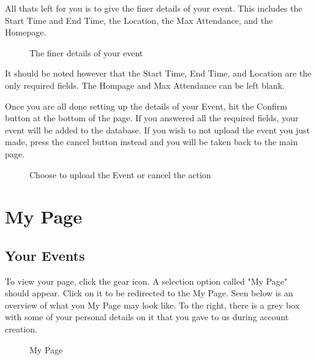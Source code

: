\documentclass[10pt]{article}
\newcommand{\fancysec}[2] {{\color{primary}\section{#1} \label{sec:#2}}}
\newcommand{\fancysub}[2] {{\color{primary}\subsection{#1} \label{sec:#2}}}
\begin{document}
			 All thats left for you is to give the finer details of your event. This includes the Start Time and End Time, the Location, the Max Attendance, and the Homepage.
			 
			  \begin{figure}[H]
			  	\centering
			  	\caption{The finer details of your event}
			  	\label{fig:awesome_image}
			  \end{figure}
			  
			  It should be noted however that the Start Time, End Time, and Location are the only required fields. The Hompage and Max Attendance can be left blank. \\
			  \par Once you are all done setting up the details of your Event, hit the Confirm button at the bottom of the page. If you answered all the required fields, your event will be added to the database. If you wish to not upload the event you just made, press the cancel button instead and you will be taken back to the main page.
			
			  \begin{figure}[H]
			  	\centering
			  	\caption{Choose to upload the Event or cancel the action}
			  	\label{fig:awesome_image}
			  \end{figure}
	
	\clearpage
	\fancysec{My Page}{mypage}
		\fancysub{Your Events}{uevents}
		
			To view your page, click the gear icon. A selection option called "My Page" should appear. Click on it to be redirected to the My Page. Seen below is an overview of what you My Page may look like. To the right, there is a grey box with some of your personal details on it that you gave to us during account creation.
		
			\begin{figure}[H]
				\centering
				\caption{My Page}
				\label{fig:awesome_image}
			\end{figure}	
			
\end{document}
